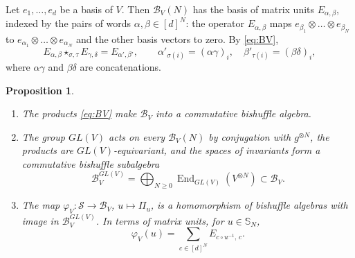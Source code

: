 \documentclass[11pt]{amsart}
\newtheorem{proposition}[theorem]{Proposition}
\theoremstyle{definition}
\theoremstyle{remark}
\newcommand{\bS}{\mathbb{S}}
\newcommand{\cB}{\mathcal{B}}
\newcommand{\cS}{\mathscr{S}}
\newcommand{\End}{\operatorname{End}}
\begin{document}
Let $e_1,\dots,e_d$ be a basis of $V$. Then $\cB_V(N)$ has the basis of matrix units $E_{\alpha,\beta}$, indexed by the pairs of words $\alpha,\beta\in[d]^N$: the operator $E_{\alpha,\beta}$ maps $e_{\beta_1}\otimes\dots\otimes e_{\beta_N}$ to $e_{\alpha_1}\otimes\dots\otimes e_{\alpha_N}$ and the other basis vectors to zero. By \eqref{eq:BV},
\begin{equation}\label{eq:BV-words}
E_{\alpha,\beta}\star_{\sigma,\tau}E_{\gamma,\delta}=E_{\alpha',\beta'},\qquad\alpha'_{\sigma(i)}=(\alpha\gamma)_i,\quad\beta'_{\tau(i)}=(\beta\delta)_i,
\end{equation}
where $\alpha\gamma$ and $\beta\delta$ are concatenations.

\begin{proposition}\label{prop:BV}
\begin{enumerate}
\item The products \eqref{eq:BV} make $\cB_V$ into a commutative bishuffle algebra.
\item The group $GL(V)$ acts on every $\cB_V(N)$ by conjugation with $g^{\otimes N}$, the products are $GL(V)$-equivariant, and the spaces of invariants form a commutative bishuffle subalgebra
\[
\cB_V^{GL(V)}=\bigoplus_{N\ge0}\End_{GL(V)}(V^{\otimes N})\subset\cB_V .
\]
\item The map $\varphi_V\colon\cS\to\cB_V$, $u\mapsto\Pi_u$, is a homomorphism of bishuffle algebras with image in $\cB_V^{GL(V)}$. In terms of matrix units, for $u\in\bS_N$,
\[
\varphi_V(u)=\sum_{c\in[d]^N}E_{c\circ u^{-1},\,c}.
\]
\end{enumerate}
\end{proposition}
\end{document}
